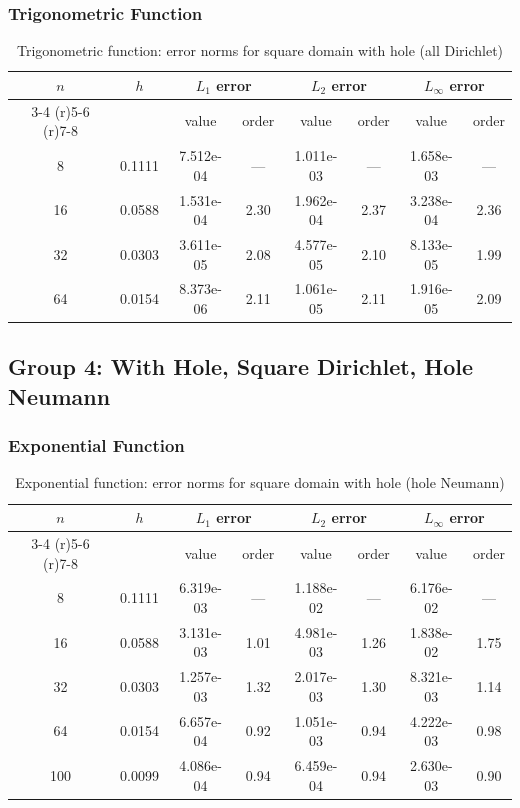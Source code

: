 \documentclass[12pt,a4paper]{article}
\begin{document}
\subsubsection{Trigonometric Function}
\begin{table}[H]
\centering
\caption{Trigonometric function: error norms for square domain with hole (all Dirichlet)}
\begin{tabular}{cccccccc}
\toprule
$n$ & $h$ & \multicolumn{2}{c}{$L_1$ error} & \multicolumn{2}{c}{$L_2$ error} & \multicolumn{2}{c}{$L_\infty$ error} \\
\cmidrule(r){3-4} \cmidrule(r){5-6} \cmidrule(r){7-8}
& & value & order & value & order & value & order \\
\midrule
8  & 0.1111 & 7.512e-04 & --- & 1.011e-03 & --- & 1.658e-03 & --- \\
16 & 0.0588 & 1.531e-04 & 2.30 & 1.962e-04 & 2.37 & 3.238e-04 & 2.36 \\
32 & 0.0303 & 3.611e-05 & 2.08 & 4.577e-05 & 2.10 & 8.133e-05 & 1.99 \\
64 & 0.0154 & 8.373e-06 & 2.11 & 1.061e-05 & 2.11 & 1.916e-05 & 2.09 \\
\bottomrule
\end{tabular}
\end{table}

\subsection{Group 4: With Hole, Square Dirichlet, Hole Neumann}

\subsubsection{Exponential Function}
\begin{table}[H]
\centering
\caption{Exponential function: error norms for square domain with hole (hole Neumann)}
\begin{tabular}{cccccccc}
\toprule
$n$ & $h$ & \multicolumn{2}{c}{$L_1$ error} & \multicolumn{2}{c}{$L_2$ error} & \multicolumn{2}{c}{$L_\infty$ error} \\
\cmidrule(r){3-4} \cmidrule(r){5-6} \cmidrule(r){7-8}
& & value & order & value & order & value & order \\
\midrule
8  & 0.1111 & 6.319e-03 & --- & 1.188e-02 & --- & 6.176e-02 & --- \\
16 & 0.0588 & 3.131e-03 & 1.01 & 4.981e-03 & 1.26 & 1.838e-02 & 1.75 \\
32 & 0.0303 & 1.257e-03 & 1.32 & 2.017e-03 & 1.30 & 8.321e-03 & 1.14 \\
64 & 0.0154 & 6.657e-04 & 0.92 & 1.051e-03 & 0.94 & 4.222e-03 & 0.98 \\
100 & 0.0099 & 4.086e-04 & 0.94 & 6.459e-04 & 0.94 & 2.630e-03 & 0.90 \\
\bottomrule
\end{tabular}
\end{table}
\end{document}
